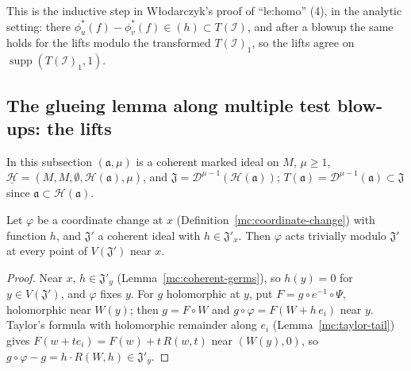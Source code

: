This is the inductive step in Włodarczyk's proof of ``le:homo'' (4), in the analytic setting: there \(\phi_u^*(f)-\phi_v^*(f)\in(h)\subset T(\mathcal I)\),
and after a blowup the same holds for the lifts modulo the transformed \(T(\mathcal I)_1\), so the lifts agree on \(\operatorname{supp}(T(\mathcal I)_1,1)\).

\subsection{The glueing lemma along multiple test blow-ups: the lifts}

In this subsection \((\mathfrak a,\mu)\) is a coherent marked ideal on \(M\), \(\mu\ge1\), \(\underline{\mathcal H}=(M,M,\emptyset,\mathcal H(\mathfrak a),\mu)\),
and \(\mathfrak J=\mathcal D^{\mu-1}(\mathcal H(\mathfrak a))\); \(T(\mathfrak a)=\mathcal D^{\mu-1}(\mathfrak a)\subset\mathfrak J\) since \(\mathfrak a\subset\mathcal H(\mathfrak a)\).

\begin{lemma}
\label{mc:coordinate-change-trivial}
\leanok
Let \(\varphi\) be a coordinate change at \(x\) (Definition~\ref{mc:coordinate-change}) with function \(h\), and \(\mathfrak J'\) a coherent ideal with
\(h\in\mathfrak J'_x\). Then \(\varphi\) acts trivially modulo \(\mathfrak J'\) at every point of \(V(\mathfrak J')\) near \(x\).
\end{lemma}
\begin{proof}
\leanok
Near \(x\), \(h\in\mathfrak J'_y\) (Lemma~\ref{mc:coherent-germs}), so \(h(y)=0\) for \(y\in V(\mathfrak J')\), and \(\varphi\) fixes \(y\). For \(g\) holomorphic at
\(y\), put \(F=g\circ e^{-1}\circ\Psi\), holomorphic near \(W(y)\); then \(g=F\circ W\) and \(g\circ\varphi=F(W+h\,e_i)\) near \(y\). Taylor's formula
with holomorphic remainder along \(e_i\) (Lemma~\ref{mc:taylor-tail}) gives \(F(w+te_i)=F(w)+t\,R(w,t)\) near \((W(y),0)\), so
\(g\circ\varphi-g=h\cdot R(W,h)\in\mathfrak J'_y\).
\end{proof}

